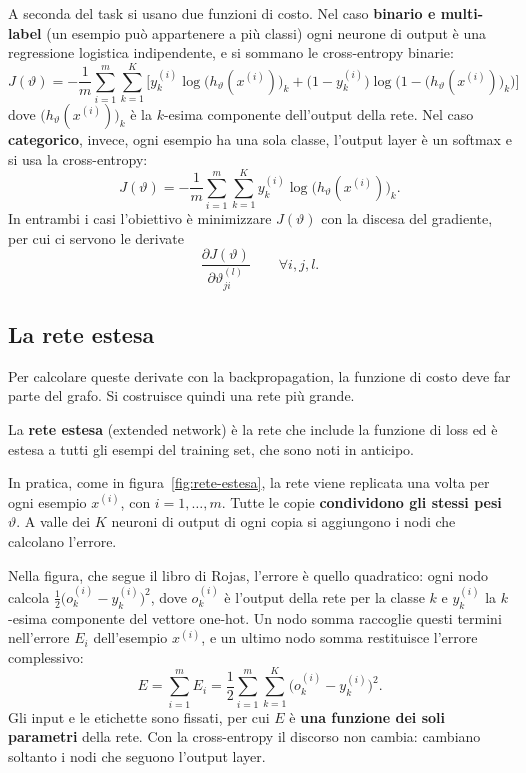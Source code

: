 A seconda del task si usano due funzioni di costo. Nel caso \textbf{binario e multi-label} (un esempio può appartenere a più classi) ogni neurone di output è una regressione logistica indipendente, e si sommano le cross-entropy binarie:
\[
J(\vartheta) = -\frac{1}{m}\sum_{i=1}^{m}\sum_{k=1}^{K}\Big[y_k^{(i)}\log\big(h_\vartheta(x^{(i)})\big)_k + \big(1 - y_k^{(i)}\big)\log\Big(1 - \big(h_\vartheta(x^{(i)})\big)_k\Big)\Big]
\]
dove $\big(h_\vartheta(x^{(i)})\big)_k$ è la $k$-esima componente dell'output della rete. Nel caso \textbf{categorico}, invece, ogni esempio ha una sola classe, l'output layer è un softmax e si usa la cross-entropy:
\[
J(\vartheta) = -\frac{1}{m}\sum_{i=1}^{m}\sum_{k=1}^{K} y_k^{(i)}\log\big(h_\vartheta(x^{(i)})\big)_k.
\]
In entrambi i casi l'obiettivo è minimizzare $J(\vartheta)$ con la discesa del gradiente, per cui ci servono le derivate
\[
\frac{\partial J(\vartheta)}{\partial \vartheta_{ji}^{(l)}} \qquad \forall i, j, l.
\]

\subsection{La rete estesa}
Per calcolare queste derivate con la backpropagation, la funzione di costo deve far parte del grafo. Si costruisce quindi una rete più grande.

\begin{definizione}
La \textbf{rete estesa} (extended network) è la rete che include la funzione di loss ed è estesa a tutti gli esempi del training set, che sono noti in anticipo.
\end{definizione}

In pratica, come in figura~\ref{fig:rete-estesa}, la rete viene replicata una volta per ogni esempio $x^{(i)}$, con $i = 1, \dots, m$. Tutte le copie \textbf{condividono gli stessi pesi} $\vartheta$. A valle dei $K$ neuroni di output di ogni copia si aggiungono i nodi che calcolano l'errore.

Nella figura, che segue il libro di Rojas, l'errore è quello quadratico: ogni nodo calcola $\frac{1}{2}\big(o_k^{(i)} - y_k^{(i)}\big)^2$, dove $o_k^{(i)}$ è l'output della rete per la classe $k$ e $y_k^{(i)}$ la $k$-esima componente del vettore one-hot. Un nodo somma raccoglie questi termini nell'errore $E_i$ dell'esempio $x^{(i)}$, e un ultimo nodo somma restituisce l'errore complessivo:
\[
E = \sum_{i=1}^{m}E_i = \frac{1}{2}\sum_{i=1}^{m}\sum_{k=1}^{K}\big(o_k^{(i)} - y_k^{(i)}\big)^2.
\]
Gli input e le etichette sono fissati, per cui $E$ è \textbf{una funzione dei soli parametri} della rete. Con la cross-entropy il discorso non cambia: cambiano soltanto i nodi che seguono l'output layer.

